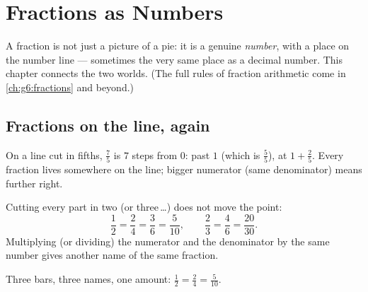 \chapter{Fractions as Numbers}\label{ch:g5:fractions}

A fraction is not just a picture of a pie: it is a genuine
\emph{number}, with a place on the number line --- sometimes the very
same place as a decimal number. This chapter connects the two
worlds. (The full rules of fraction arithmetic come in
\cref{ch:g6:fractions} and beyond.)

\section{Fractions on the line, again}

\begin{example}\label{ex:g5:fractions:place}
On a line cut in fifths, $\frac{7}{5}$ is $7$ steps from $0$: past
$1$ (which is $\frac55$), at $1 + \frac25$. Every fraction lives
somewhere on the line; bigger numerator (same denominator) means
further right.
\end{example}

\begin{proposition}\label{prop:g5:fractions:equal}
Cutting every part in two (or three\,\dots) does not move the
point:
\[
\frac{1}{2} = \frac{2}{4} = \frac{3}{6} = \frac{5}{10},
\qquad
\frac{2}{3} = \frac{4}{6} = \frac{20}{30}.
\]
Multiplying (or dividing) the numerator and the denominator by the
same number gives another name of the same fraction.
\end{proposition}
\admitted

\begin{omfigure}

{\small Three bars, three names, one amount: $\frac12 = \frac24 =
\frac{5}{10}$.}
\end{omfigure}

